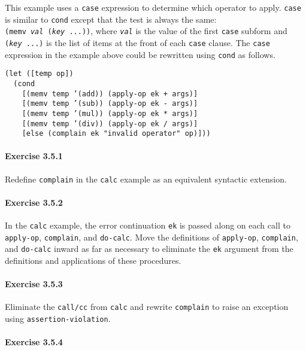 This example uses a \texttt{case} expression to determine which operator
to apply.
\texttt{case} is similar to \texttt{cond} except that the test is always the
same: \texttt{(memv \textit{val} (\textit{key} ...))}, where \texttt{\textit{val}}
is the value of the first \texttt{case} subform and \texttt{(\textit{key} ...)}
is the list of items at the front of each \texttt{case} clause.
The \texttt{case} expression in the example above could be rewritten
using \texttt{cond} as follows.


\begin{alltt}
(let ([temp op])
  (cond
    [(memv temp '(add)) (apply-op ek + args)]
    [(memv temp '(sub)) (apply-op ek - args)]
    [(memv temp '(mul)) (apply-op ek * args)]
    [(memv temp '(div)) (apply-op ek / args)]
    [else (complain ek "invalid operator" op)]))
\end{alltt}

\paragraph{Exercise \label{further_g80}3.5.1}


\label{further_s86}Redefine \texttt{complain} in the \texttt{calc} example as an equivalent syntactic
extension.




\paragraph{Exercise \label{further_g81}3.5.2}


\label{further_s87}In the \texttt{calc} example, the error continuation \texttt{ek} is passed
along on
each call to \texttt{apply-op}, \texttt{complain}, and \texttt{do-calc}.
Move the definitions of \texttt{apply-op}, \texttt{complain}, and
\texttt{do-calc} inward as far as necessary to eliminate the
\texttt{ek} argument from the definitions and applications
of these procedures.




\paragraph{Exercise \label{further_g82}3.5.3}


\label{further_s88}Eliminate the \texttt{call/cc} from \texttt{calc} and rewrite \texttt{complain} to
raise an exception using \texttt{assertion-violation}.




\paragraph{Exercise \label{further_g83}3.5.4}


